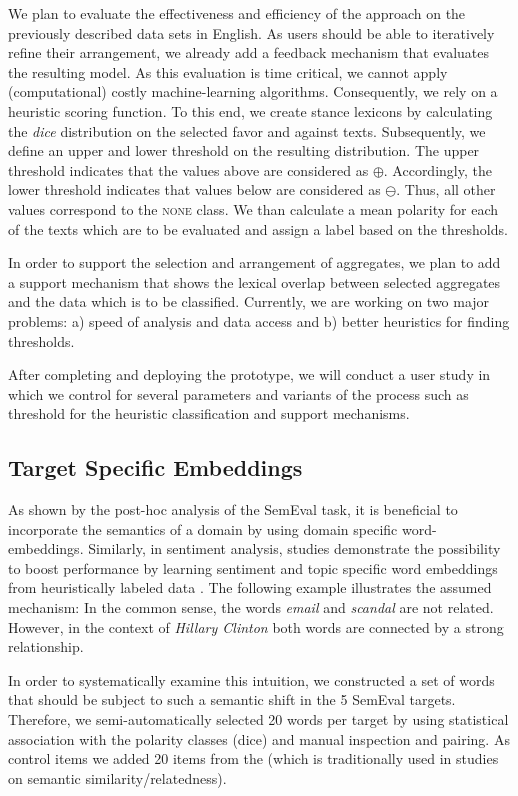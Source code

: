 \documentclass[11pt]{article}
\begin{document}
We plan to evaluate the effectiveness and efficiency of the approach on the previously described data sets in English.
As users should be able to iteratively refine their arrangement, we already add a feedback mechanism that evaluates the resulting model.
As this evaluation is time critical, we cannot apply (computational) costly machine-learning algorithms.
Consequently, we rely on a heuristic scoring function.
To this end, we create stance lexicons by calculating the \textit{dice} distribution on the selected favor and against texts.
Subsequently, we define an upper and lower threshold on the resulting distribution.
The upper threshold indicates that the values above are considered as $\oplus$.
Accordingly, the lower threshold indicates that values below are considered as $\ominus$.
Thus, all other values correspond to the \textsc{none} class.
We than calculate a mean polarity for each of the texts which are to be evaluated and assign a label based on the thresholds.

In order to support the selection and arrangement of aggregates, we plan to add a support mechanism that shows the lexical overlap between selected aggregates and the data which is to be classified. 
Currently, we are working on two major problems: a) speed of analysis and data access and b) better heuristics for finding thresholds. 

After completing and deploying the prototype, we will conduct a user study in which we control for several parameters and variants of the process such as threshold for the heuristic classification and support mechanisms.


\subsection{Target Specific Embeddings}
As shown by the post-hoc analysis of the SemEval task, it is beneficial to incorporate the semantics of a domain by using domain specific word-embeddings.
Similarly, in sentiment analysis, studies demonstrate the possibility to boost performance by learning sentiment and topic specific word embeddings from heuristically labeled data \cite{ren2016improving,lan2016three,tang2016sentiment}.
The following example illustrates the assumed mechanism:
In the common sense, the words \textit{email} and \textit{scandal} are not related.
However, in the context of \textit{Hillary Clinton} both words are connected by a strong relationship.

In order to systematically examine this intuition, we constructed a set of words that should be subject to such a semantic shift in the 5 SemEval targets.
Therefore, we semi-automatically selected 20 words per target by using statistical association with the polarity classes (dice) and manual inspection and pairing.
As control items we added 20 items from the \cite{finkelstein2001placing} (which is traditionally used in studies on semantic similarity/relatedness).
\end{document}
